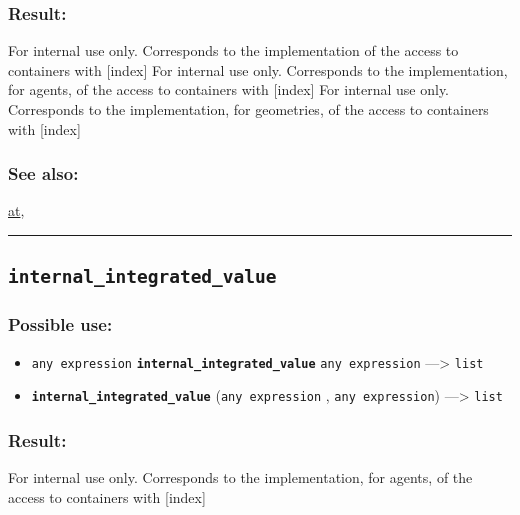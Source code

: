 \documentclass[]{book}
\providecommand{\tightlist}{%
  \setlength{\itemsep}{0pt}\setlength{\parskip}{0pt}}
\theoremstyle{definition}
\theoremstyle{definition}
\theoremstyle{definition}
\theoremstyle{remark}
\begin{document}
\subsubsection{Result:}\label{result-269}

For internal use only. Corresponds to the implementation of the access
to containers with {[}index{]} For internal use only. Corresponds to the
implementation, for agents, of the access to containers with {[}index{]}
For internal use only. Corresponds to the implementation, for
geometries, of the access to containers with {[}index{]}

\subsubsection{See also:}\label{see-also-120}

\href{OperatorsAA\#at}{at},

\begin{center}\rule{0.5\linewidth}{\linethickness}\end{center}

\subsection{\texorpdfstring{\texttt{internal\_integrated\_value}}{internal\_integrated\_value}}\label{internal_integrated_value}

\subsubsection{Possible use:}\label{possible-use-280}

\begin{itemize}
\tightlist
\item
  \texttt{any\ expression} \textbf{\texttt{internal\_integrated\_value}}
  \texttt{any\ expression} ---\textgreater{} \texttt{list}
\item
  \textbf{\texttt{internal\_integrated\_value}}
  (\texttt{any\ expression} , \texttt{any\ expression})
  ---\textgreater{} \texttt{list}
\end{itemize}

\subsubsection{Result:}\label{result-270}

For internal use only. Corresponds to the implementation, for agents, of
the access to containers with {[}index{]}
\end{document}
